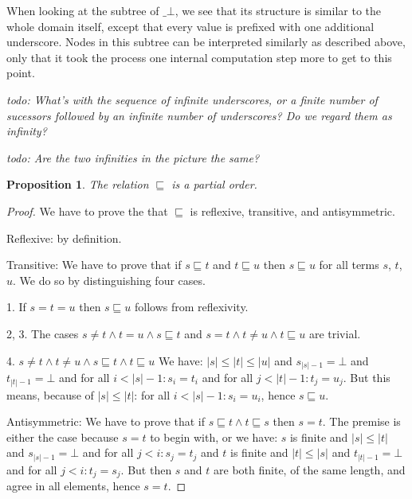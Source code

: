 \documentclass[a4paper]{article}
\newcommand{\todo}[1]{\bigskip \noindent \emph{todo: #1}}
\newtheorem{thmPONuFisPartial}[defNuF]{Proposition}
\begin{document}
When looking at the subtree of $\_\bot$, we see that its structure is similar
to the whole domain itself, except that every value is prefixed with one additional
underscore.  Nodes in this subtree can be interpreted similarly as described
above, only that it took the process one internal computation step more to
get to this point.

\todo{What's with the sequence of infinite underscores, or a finite number of
sucessors followed by an infinite number of underscores?  Do we regard them as
infinity?}

\todo{Are the two infinities in the picture the same?}

\begin{thmPONuFisPartial}

The relation $\sqsubseteq$ is a partial order.

\end{thmPONuFisPartial}


\begin{proof}

We have to prove the that $\sqsubseteq$ is reflexive, transitive, and
antisymmetric.

Reflexive: by definition.

Transitive: We have to prove that if $s \sqsubseteq t$ and $t \sqsubseteq u$
then $s \sqsubseteq u$ for all terms $s$, $t$, $u$. We do so by distinguishing
four cases.

1. If $s = t = u$ then $s \sqsubseteq u$ follows from reflexivity.

2, 3. The cases $s \neq t \wedge t = u \wedge s \sqsubseteq t$ and $s = t
\wedge t \neq u \wedge t \sqsubseteq u$ are trivial.

4. $s \neq t \wedge t \neq u \wedge s \sqsubseteq t \wedge t \sqsubseteq u$ We
have: $|s| \leq |t| \leq |u|$ and $s_{|s|-1} = \bot$ and $t_{|t|-1} = \bot$ and
for all $i < |s|-1: s_i = t_i$ and for all $j < |t|-1: t_j = u_j$.  But this
means, because of $|s| \leq |t|$: for all $i < |s|-1: s_i = u_i$, hence $s
\sqsubseteq u$.

Antisymmetric: We have to prove that if $s \sqsubseteq t \wedge t \sqsubseteq
s$ then $s = t$.  The premise is either the case because $s = t$ to begin with,
or we have: $s$ is finite and $|s| \leq |t|$ and $s_{|s|-1} = \bot$ and for all $j <
i: s_j = t_j$ and $t$ is finite and $|t| \leq |s|$ and $t_{|t|-1} = \bot$ and for all
$j < i: t_j = s_j$.  But then $s$ and $t$ are both finite, of the same length,
and agree in all elements, hence $s = t$.

\end{proof}
\end{document}
